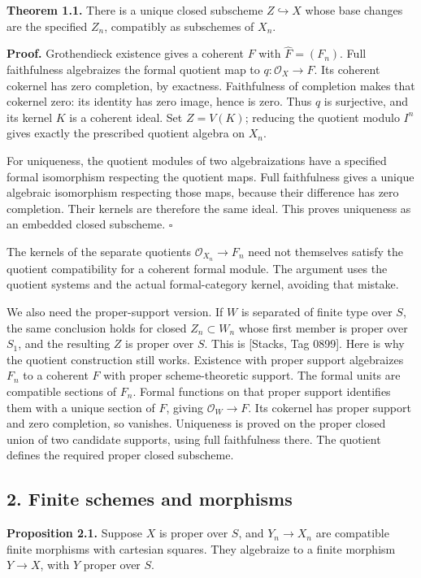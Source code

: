 \documentclass[11pt]{article}
\begin{document}
\textbf{Theorem 1.1.} There is a unique closed subscheme
\(Z\hookrightarrow X\) whose base changes are the specified \(Z_n\),
compatibly as subschemes of \(X_n\).

\textbf{Proof.} Grothendieck existence gives a coherent \(F\) with
\(\widehat F=(F_n)\). Full faithfulness algebraizes the formal quotient
map to \(q:\mathcal O_X\to F\). Its coherent cokernel has zero
completion, by exactness. Faithfulness of completion makes that cokernel
zero: its identity has zero image, hence is zero. Thus \(q\) is
surjective, and its kernel \(K\) is a coherent ideal. Set \(Z=V(K)\);
reducing the quotient modulo \(I^n\) gives exactly the prescribed
quotient algebra on \(X_n\).

For uniqueness, the quotient modules of two algebraizations have a
specified formal isomorphism respecting the quotient maps. Full
faithfulness gives a unique algebraic isomorphism respecting those maps,
because their difference has zero completion. Their kernels are
therefore the same ideal. This proves uniqueness as an embedded closed
subscheme. \(\square\)

The kernels of the separate quotients \(\mathcal O_{X_n}\to F_n\) need
not themselves satisfy the quotient compatibility for a coherent formal
module. The argument uses the quotient systems and the actual
formal-category kernel, avoiding that mistake.

We also need the proper-support version. If \(W\) is separated of finite
type over \(S\), the same conclusion holds for closed \(Z_n\subset W_n\)
whose first member is proper over \(S_1\), and the resulting \(Z\) is
proper over \(S\). This is {[}Stacks, Tag 0899{]}. Here is why the
quotient construction still works. Existence with proper support
algebraizes \(F_n\) to a coherent \(F\) with proper scheme-theoretic
support. The formal units are compatible sections of \(F_n\). Formal
functions on that proper support identifies them with a unique section
of \(F\), giving \(\mathcal O_W\to F\). Its cokernel has proper support
and zero completion, so vanishes. Uniqueness is proved on the proper
closed union of two candidate supports, using full faithfulness there.
The quotient defines the required proper closed subscheme.

\subsection{2. Finite schemes and
morphisms}\label{finite-schemes-and-morphisms}

\textbf{Proposition 2.1.} Suppose \(X\) is proper over \(S\), and
\(Y_n\to X_n\) are compatible finite morphisms with cartesian squares.
They algebraize to a finite morphism \(Y\to X\), with \(Y\) proper over
\(S\).
\end{document}
